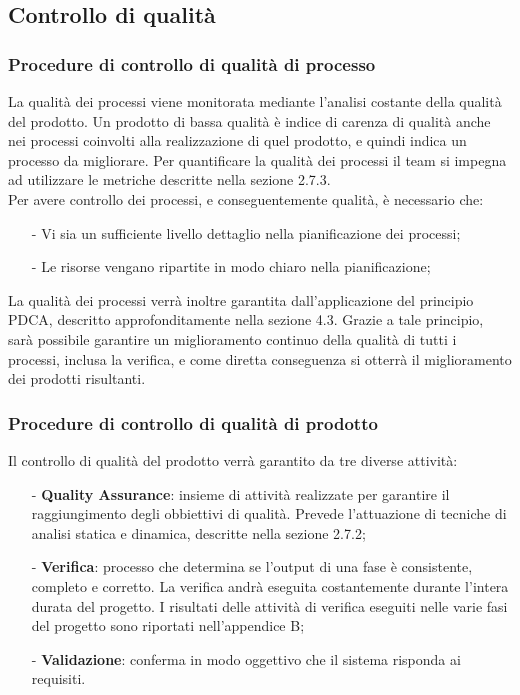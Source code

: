 \subsection{Controllo di qualità}

\subsubsection{Procedure di controllo di qualità di processo}
La qualità dei processi viene monitorata mediante l'analisi costante della qualità del prodotto. Un prodotto di bassa qualità è indice di carenza di qualità anche nei processi coinvolti alla realizzazione di quel prodotto, e quindi indica un processo da migliorare. Per quantificare la qualità dei processi il team si impegna ad utilizzare le metriche descritte nella sezione 2.7.3.
\\
Per avere controllo dei processi, e conseguentemente qualità, è necessario che:
\begin{itemize}
	\item[-] Vi sia un sufficiente livello dettaglio nella pianificazione dei processi;
	\item[-] Le risorse vengano ripartite in modo chiaro nella pianificazione;
\end{itemize}
La qualità dei processi verrà inoltre garantita dall'applicazione del principio PDCA, descritto approfonditamente nella sezione 4.3. Grazie a tale principio, sarà possibile garantire un miglioramento continuo della qualità di tutti i processi, inclusa la verifica, e come diretta conseguenza si otterrà il miglioramento dei prodotti risultanti.

\subsubsection{Procedure di controllo di qualità di prodotto}
Il controllo di qualità del prodotto verrà garantito da tre diverse attività:
\begin{itemize}
	\item[-] \textbf{Quality Assurance}: insieme di attività realizzate per garantire il raggiungimento degli obbiettivi di qualità. Prevede l'attuazione di tecniche di analisi statica e dinamica, descritte nella sezione 2.7.2;
	\item[-] \textbf{Verifica}: processo che determina se l'output di una fase è consistente, completo e corretto. La verifica andrà eseguita costantemente durante l'intera durata del progetto. I risultati delle attività di verifica eseguiti nelle varie fasi del progetto sono riportati nell'appendice B;
	\item[-] \textbf{Validazione}: conferma in modo oggettivo che il sistema risponda ai requisiti.
\end{itemize}

